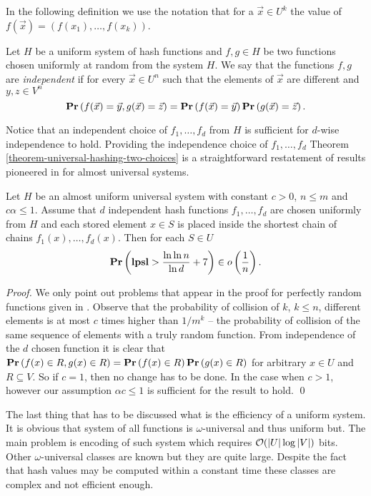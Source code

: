 In the following definition we use the notation that for a $\vec{x} \in U^k$ the value of $f(\vec{x}) = (f(x_1), \dots, f(x_k))$.
\begin{definition}
\label{definition-independent-hash-functions}
Let $H$ be a uniform system of hash functions and $f, g \in H$ be two functions chosen uniformly at random from the system $H$. We say that the functions $f, g$ are \emph{independent} if for every $\vec{x} \in U^n$ such that the elements of $\vec{x}$ are different and $y, z \in V^n$ $$\mathbf{Pr}\left(f(\vec{x}) = \vec{y}, g(\vec{x}) = \vec{z}\right) = \mathbf{Pr}\left(f(\vec{x}) = \vec{y}\right) \mathbf{Pr}\left(g(\vec{x}) = \vec{z}\right).$$
\end{definition}

Notice that an independent choice of $f_1, \dots, f_d$ from $H$ is sufficient for $d$-wise independence to hold. Providing the independence choice of $f_1, \dots, f_d$ Theorem \ref{theorem-universal-hashing-two-choices} is a straightforward restatement of results pioneered in \cite{DBLP:conf/stoc/AzarBKU94} for almost universal systems.

\begin{theorem}
\label{theorem-universal-hashing-two-choices}
Let $H$ be an almost uniform universal system with constant $c > 0$, $n \leq m$ and $c \alpha \leq 1$. Assume that $d$ independent hash functions $f_1, \dots, f_d$ are chosen uniformly from $H$ and each stored element $x \in S$ is placed inside the shortest chain of chains $f_1(x), \dots, f_d(x)$. Then for each $S \in U$ $$\mathbf{Pr}\left(\mathbf{lpsl} > \frac{\ln \ln n}{\ln d} + 7\right) \in o\left(\frac{1}{n}\right).$$
\end{theorem}
\begin{proof}
We only point out problems that appear in the proof for perfectly random functions given in \cite{Mitzenmacher:2005:PCR:1076315}. Observe that the probability of collision of $k$, $k \leq n$, different elements is at most $c$ times higher than ${1}/{m^k}$ -- the probability of collision of the same sequence of elements with a truly random function. From independence of the $d$ chosen function it is clear that $\mathbf{Pr}\left(f(x) \in R, g(x) \in R\right) = \mathbf{Pr}\left(f(x) \in R\right)\mathbf{Pr}\left(g(x)\in R\right)$ for arbitrary $x \in U$ and $R \subseteq V$. So if $c = 1$, then no change has to be done. In the case when $c > 1$, however our assumption $\alpha c \leq 1$ is sufficient for the result to hold.
\qed
\end{proof}

The last thing that has to be discussed what is the efficiency of a uniform system. It is obvious that system of all functions is $\omega$-universal and thus uniform but. The main problem is encoding of such system which requires $\mathcal{O}(|U| \log |V|)$ bits. Other $\omega$-universal classes are known but they are quite large. Despite the fact that hash values may be computed within a constant time these classes are complex and not efficient enough. 

